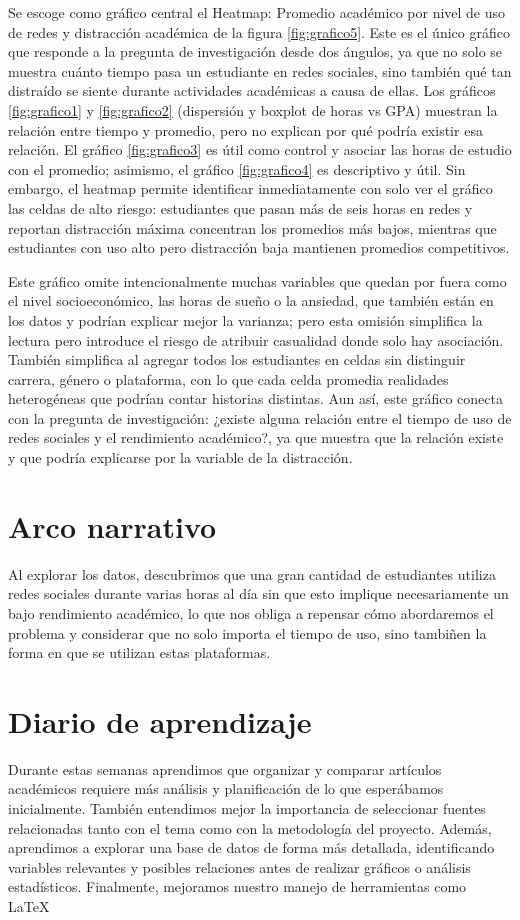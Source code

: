 \documentclass[12pt]{article}
\begin{document}
Se escoge como gráfico central el Heatmap: Promedio académico por nivel de uso de redes y distracción académica de la figura \ref{fig:grafico5}. Este es el único gráfico que responde a la pregunta de investigación desde dos ángulos, ya que no solo se muestra cuánto tiempo pasa un estudiante en redes sociales, sino también qué tan distraído se siente durante actividades académicas a causa de ellas. Los gráficos \ref{fig:grafico1} y \ref{fig:grafico2} (dispersión y boxplot de horas vs GPA) muestran la relación entre tiempo y promedio, pero no explican por qué podría existir esa relación. El gráfico \ref{fig:grafico3} es útil como control y asociar las horas de estudio con el promedio; asimismo, el gráfico \ref{fig:grafico4} es descriptivo y útil. Sin embargo, el heatmap permite identificar inmediatamente con solo ver el gráfico las celdas de alto riesgo: estudiantes que pasan más de seis horas en redes y reportan distracción máxima concentran los promedios más bajos, mientras que estudiantes con uso alto pero distracción baja mantienen promedios competitivos. 

Este gráfico omite intencionalmente muchas variables que quedan por fuera como el nivel socioeconómico, las horas de sueño o la ansiedad, que también están en los datos y podrían explicar mejor la varianza; pero esta omisión simplifica la lectura pero introduce el riesgo de atribuir casualidad donde solo hay asociación. También simplifica al agregar todos los estudiantes en celdas sin distinguir carrera, género o plataforma, con lo que cada celda promedia realidades heterogéneas que podrían contar historias distintas. Aun así, este gráfico conecta con la pregunta de investigación: ¿existe alguna relación entre el tiempo de uso de redes sociales y el rendimiento académico?, ya que muestra que la relación existe y que podría explicarse por la variable de la distracción. 

\section{Arco narrativo}
Al explorar los datos, descubrimos que una gran cantidad de estudiantes utiliza redes sociales durante varias horas al día sin que esto implique necesariamente un bajo rendimiento académico, lo que nos obliga a repensar cómo abordaremos el problema y considerar que no solo importa el tiempo de uso, sino tambiñen la forma en que se utilizan estas plataformas.

\section{Diario de aprendizaje}
Durante estas semanas aprendimos que organizar y comparar artículos académicos requiere más análisis y planificación de lo que esperábamos inicialmente. También entendimos mejor la importancia de seleccionar fuentes relacionadas tanto con el tema como con la metodología del proyecto. Además, aprendimos a explorar una base de datos de forma más detallada, identificando variables relevantes y posibles relaciones antes de realizar gráficos o análisis estadísticos. Finalmente, mejoramos nuestro manejo de herramientas como LaTeX
\end{document}
